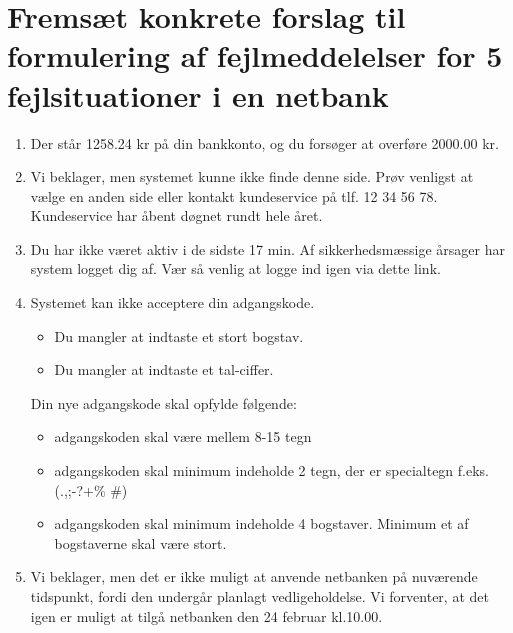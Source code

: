 \documentclass[12pt]{article}
\begin{document}
\section*{Fremsæt konkrete forslag til formulering af fejlmeddelelser
           for 5 fejlsituationer i en netbank} 
\begin{enumerate}
  \item Der står 1258.24 kr på din bankkonto, og du forsøger at overføre 2000.00 kr.
  \item Vi beklager, men systemet kunne ikke finde denne side. Prøv venligst at vælge en anden side eller kontakt kundeservice på tlf. 12 34 56 78. Kundeservice har åbent døgnet rundt hele året.
  \item Du har ikke været aktiv i de sidste 17 min. Af sikkerhedsmæssige årsager har system logget dig af. Vær så venlig at logge ind igen via dette link.
  \item Systemet kan ikke acceptere din adgangskode. 

    \begin{itemize}
    
    \item Du mangler at indtaste et stort bogstav.

    \item  Du mangler at indtaste et tal-ciffer.


   \end{itemize}


    Din nye adgangskode skal opfylde følgende: \begin{itemize}
    \item adgangskoden skal være mellem 8-15 tegn
    \item adgangskoden skal minimum indeholde 2 tegn, der er specialtegn f.eks. (.,;-?+\% \#)
    \item adgangskoden skal minimum indeholde 4 bogstaver. Minimum et af bogstaverne skal være stort.
  \end{itemize}
\item Vi beklager, men det er ikke muligt at anvende netbanken på nuværende tidspunkt, fordi den undergår planlagt vedligeholdelse. Vi forventer, at det igen er muligt at tilgå netbanken den 24 februar kl.10.00.

\end{enumerate}
\end{document}
